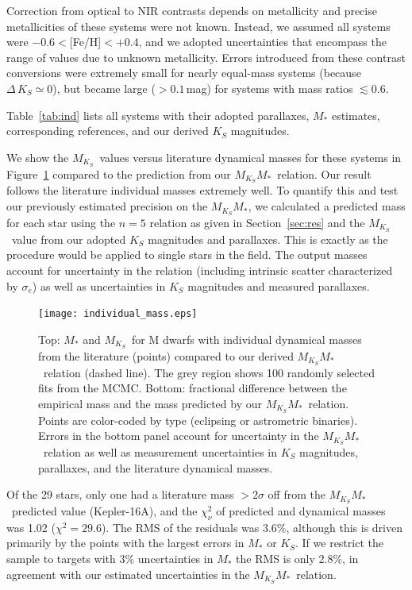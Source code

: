 \documentclass[twocolumn]{aastex62}
\newcommand{\mks}{$M_{K_S}$}
\newcommand{\mmk}{$M_{K_S}$\textendash$M_*$}
\begin{document}
Correction from optical to NIR contrasts depends on metallicity \citep[e.g., ][]{Schlaufman2010} and precise metallicities of these systems were not known. Instead, we assumed all systems were $-0.6<$[Fe/H]$<+0.4$, and we adopted uncertainties that encompass the range of values due to unknown metallicity. Errors introduced from these contrast conversions were extremely small for nearly equal-mass systems (because $\Delta\,K_S\simeq0$), but became large ($>0.1$\,mag) for systems with mass ratios $\lesssim$0.6. 

Table~\ref{tab:ind} lists all systems with their adopted parallaxes, $M_*$ estimates, corresponding references, and our derived $K_S$ magnitudes.

We show the \mks\ values versus literature dynamical masses for these systems in Figure~\ref{fig:ind} compared to the prediction from our \mmk\ relation. Our result follows the literature individual masses extremely well. To quantify this and test our previously estimated precision on the \mmk, we calculated a predicted mass for each star using the $n=5$ relation as given in Section~\ref{sec:res} and the \mks\ value from our adopted $K_S$ magnitudes and parallaxes. This is exactly as the procedure would be applied to single stars in the field. The output masses account for uncertainty in the relation (including intrinsic scatter characterized by $\sigma_e$) as well as uncertainties in $K_S$ magnitudes and measured parallaxes. 

\begin{figure}[th]
\begin{center}
\texttt{[image: individual\_mass.eps]}
\caption{Top: $M_*$ and \mks\ for M dwarfs with individual dynamical masses from the literature (points) compared to our derived \mmk\ relation (dashed line). The grey region shows 100 randomly selected fits from the MCMC. Bottom: fractional difference between the empirical mass and the mass predicted by our \mmk\ relation. Points are color-coded by type (eclipsing or astrometric binaries). Errors in the bottom panel account for uncertainty in the \mmk\ relation as well as measurement uncertainties in $K_S$ magnitudes, parallaxes, and the literature dynamical masses. }
\label{fig:ind}
\end{center}
\end{figure}

Of the 29 stars, only one had a literature mass $>2\sigma$ off from the \mmk\ predicted value (Kepler-16A), and the $\chi^2_\nu$ of predicted and dynamical masses was 1.02 ($\chi^2=29.6$). The RMS of the residuals was 3.6\%, although this is driven primarily by the points with the largest errors in $M_*$ or $K_S$. If we restrict the sample to targets with 3\% uncertainties in $M_*$ the RMS is only 2.8\%, in agreement with our estimated uncertainties in the \mmk\ relation. 
\end{document}
